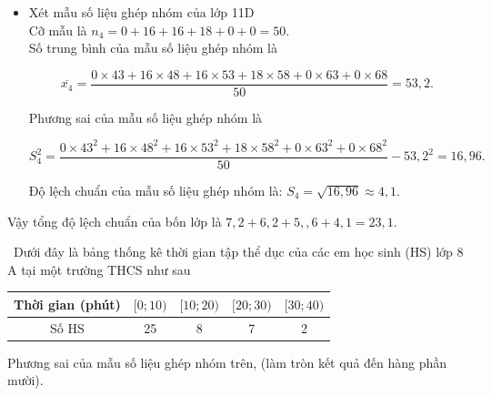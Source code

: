\begin{bt}
{\begin{itemize}
		Độ lệch chuẩn của mẫu số liệu ghép nhóm là $S_3=\sqrt{30{,}96}\approx 5{,}6$.
	\item Xét mẫu số liệu ghép nhóm của lớp 11D\\
		
		Cỡ mẫu là $n_4=0+16+16+18+0+0=50$.\\
		
		Số trung bình của mẫu số liệu ghép nhóm là
		
		$$
		\overline{x_4}=\dfrac{0 \times 43+16 \times 48+16 \times 53+18 \times 58+0 \times 63+0 \times 68}{50}=53{,}2.
		$$
		
		Phương sai của mẫu số liệu ghép nhóm là
		
		$$
		S_4^2=\dfrac{0 \times 43^2+16 \times 48^2+16 \times 53^2+18 \times 58^2+0 \times 63^2+0 \times 68^2}{50}-53{,}2^2=16{,}96.
		$$
		
		Độ lệch chuẩn của mẫu số liệu ghép nhóm là: $S_4=\sqrt{16{,}96}\approx 4{,}1$.
		\end{itemize}
	Vậy tổng độ lệch chuẩn của bốn lớp là $7{,}2+6{,}2+5{,},6+4{,}1= 23{,}1$.
	}
\end{bt}

\begin{bt}%
	\ Dưới đây là bảng thống kê thời gian tập thể dục của các em học sinh (HS) lớp $8$ A tại một trường THCS như sau
	\begin{center}
		\begin{tabular}{|c|c|c|c|c|}
			\hline Thời gian (phút) & {$[0 ; 10)$} & {$[10 ; 20)$} & {$[20 ; 30)$} & {$[30 ; 40)$} \\
			\hline Số HS & 25 & 8 & 7 & 2 \\
			\hline
		\end{tabular}
	\end{center}	
	Phương sai của mẫu số liệu ghép nhóm trên, (làm tròn kết quả đến hàng phần mười).
\end{bt}

